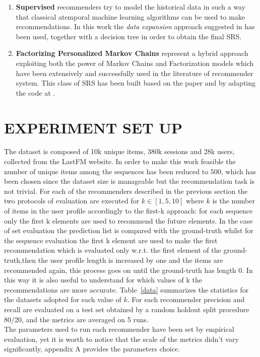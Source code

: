 \documentclass[prodmode,acmtecs]{acmsmall} %
\begin{document}
\begin{enumerate}
	\item \textbf{Supervised} recommenders try to model the historical data in such a way that classical atemporal machine learning algorithms can be used to make recommendations. In this work the \textit{data expansion} approach suggested in \cite{zidmars01temporal} has been used, together with a decision tree in order to obtain the final SRS.
	\item \textbf{Factorizing Personalized Markov Chains} represent a hybrid approach exploiting both the power of Markov Chains and Factorization models which have been extensively and successfully used in the literature of recommender system. This class of SRS has been built based on the paper\cite{rendle10FPMC} and by adapting the code at \cite{fpmcLib}.
\end{enumerate}

\section{EXPERIMENT SET UP}
The dataset is composed of 10k unique items, 380k sessions and 28k users, collected from the LastFM website. In order to make this work feasible the number of unique items among the sequences has been reduced to 500, which has been chosen since the dataset size is manageable but the recommendation task is not trivial.
For each of the recommenders described in the previous section the two protocols of evaluation are executed for $k \in [1,5,10]$ where $k$ is the number of items in the user profile accordingly to the first-k approach: for each sequence only the first k elements are used to recommend the future elements. In the case of set evaluation the prediction list is compared with the ground-truth whilst for the sequence evaluation the first k element are used to make the first recommendation which is evaluated only w.r.t. the first element of the ground-truth,then the user profile length is increased by one and the items are recommended again, this process goes on until the ground-truth has length 0. In this way it is also useful to understand for which values of k the recommendations are more accurate.
Table~\ref{data} summarizes the statistics for the datasets adopted for each value of $k$.
For each recommender precision and recall are evaluated on a test set obtained by a random holdout split procedure 80/20, and the metrics are averaged on 5 runs.\\ The parameters used to run each recommender have been set by empirical evaluation, yet it is worth to notice that the scale of the metrics didn't vary significantly, appendix A provides the parameters choice.
\end{document}
